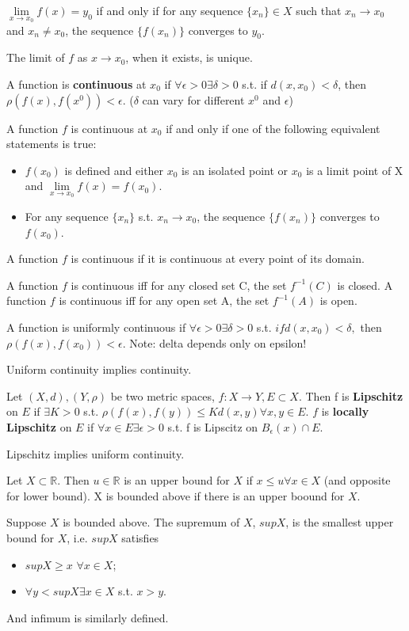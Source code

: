 \documentclass[11pt]{article} %
\begin{document}
$\lim\limits_{x \rightarrow x_0} f(x) = y_0$ if and only if for any sequence $\{ x_n\} \in X$ such that $x_n \rightarrow x_0$ and $x_n\neq x_0$, the sequence $\{ f(x_n)\}$ converges to $y_0$.

The limit of $f$ as $x \rightarrow x_0$, when it exists, is unique.

A function is \textbf{continuous} at $x_0$ if $\forall \epsilon>0 \exists \delta>0$ s.t. if $d(x,x_0) < \delta$, then $\rho(f(x),f(x^0)) < \epsilon$. ($\delta$ can vary for different $x^0$ and $\epsilon$)

A function $f$ is continuous at $x_0$ if and only if one of the following equivalent statements is true:
\begin{itemize}
\item $f(x_0)$ is defined and either $x_0$ is an isolated point or $x_0$ is a limit point of X and $\lim\limits_{x \rightarrow x_0} f(x) = f(x_0)$.
\item For any sequence $\{ x_n\}$ s.t. $x_n \rightarrow x_0$, the sequence $\{ f(x_n)\}$ converges to $f(x_0)$.
\end{itemize}

A function $f$ is continuous if it is continuous at every point of its domain.

A function $f$ is continuous iff for any closed set C, the set $f^{-1}(C)$ is closed. A function $f$ is continuous iff for any open set A, the set $f^{-1}(A)$ is open.

A function is uniformly continuous if $\forall \epsilon > 0 \exists \delta>0$ s.t. $if d(x,x_0)<\delta,$ then $\rho(f(x),f(x_0)) < \epsilon$. Note: delta depends only on epsilon!

Uniform continuity implies continuity.

Let $(X,d),(Y,\rho)$ be two metric spaces, $f:X \rightarrow Y, E\subset X.$ Then f is \textbf{Lipschitz} on $E$ if $\exists K>0$ s.t. $\rho(f(x),f(y)) \leq K d(x,y) \forall x,y \in E.$ $f$ is \textbf{locally Lipschitz} on $E$ if $\forall x \in E \exists \epsilon > 0$ s.t. f is Lipscitz on $B_{\epsilon}(x) \cap E.$

Lipschitz implies uniform continuity.

Let $X \subset \mathbb{R}.$ Then $u \in \mathbb{R}$ is an upper bound for $X$ if $x\leq u \forall x \in X$ (and opposite for lower bound). X is bounded above if there is an upper boound for $X$.

Suppose $X$ is bounded above. The supremum of $X$, $sup X$, is the smallest upper bound for $X$, i.e. $supX$ satisfies
\begin{itemize}
\item $supX \geq x$ $\forall x \in X$;
\item $\forall y<supX \exists x \in X$ s.t. $x>y$.
\end{itemize}
 And infimum is similarly defined.
\end{document}
